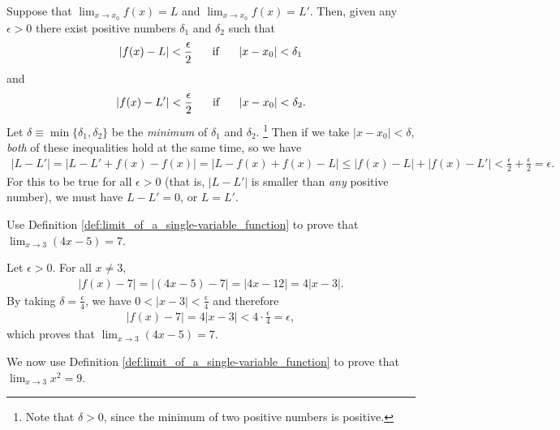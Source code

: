 \documentclass[12pt,letterpaper,reqno]{article}
\numberwithin{equation}{section}
\begin{document}
{\begin{pf}
Suppose that $\lim_{x \to x_0}f(x)=L$ and $\lim_{x \to x_0}f(x)=L'$. Then, given any $\epsilon>0$ there exist positive numbers $\delta_1$ and $\delta_2$ such that 
\begin{align*}
	|f(x)-L|<\frac{\epsilon}{2} \hspace{0.5cm} \text{ if } \hspace{0.5cm} |x-x_0|<\delta_1
\end{align*} 	
and
\begin{align*}
	|f(x)-L'|<\frac{\epsilon}{2} \hspace{0.5cm} \text{ if } \hspace{0.5cm} |x-x_0|<\delta_2.
\end{align*} 
Let $\delta\equiv \min\{\delta_1,\delta_2\}$ be the \emph{minimum} of $\delta_1$ and $\delta_2$. \footnote{Note that $\delta>0$, since the minimum of two positive numbers is positive.} Then if we take $|x-x_0|<\delta$, \emph{both} of these inequalities hold at the same time, so we have
\begin{align*}
	|L-L'|=|L-L'+f(x)-f(x)|=|L-f(x)+f(x)-L|\leq |f(x)-L|+|f(x)-L'|<\frac{\epsilon}{2}+\frac{\epsilon}{2}=\epsilon.
\end{align*}
For this to be true for all $\epsilon>0$ (that is, $|L-L'|$ is smaller than \emph{any} positive number), we must have $L-L'=0$, or $L=L'$.
\end{pf}


\begin{exercise}
Use Definition \ref{def:limit_of_a_single-variable_function} to prove that $\lim_{x \to 3}(4x-5)=7$.
\end{exercise}

{\color{red} \begin{solution}
Let $\epsilon>0$. For all $x \neq 3$, 
\begin{align*}
	|f(x)-7|=|(4x-5)-7|=|4x-12|=4|x-3|.
\end{align*} 
By taking $\delta=\frac{\epsilon}{4}$, we have $0<|x-3|<\frac{\epsilon}{4}$ and therefore
\begin{align*}
	|f(x)-7|=4|x-3|<4\cdot \frac{\epsilon}{4}=\epsilon,
\end{align*}	
which proves that $\lim_{x \to 3}(4x-5)=7$.
\end{solution}}

\begin{example}
We now use Definition \ref{def:limit_of_a_single-variable_function} to prove that $\lim_{x \to 3}x^2=9$.	


\end{example}}
\end{document}
